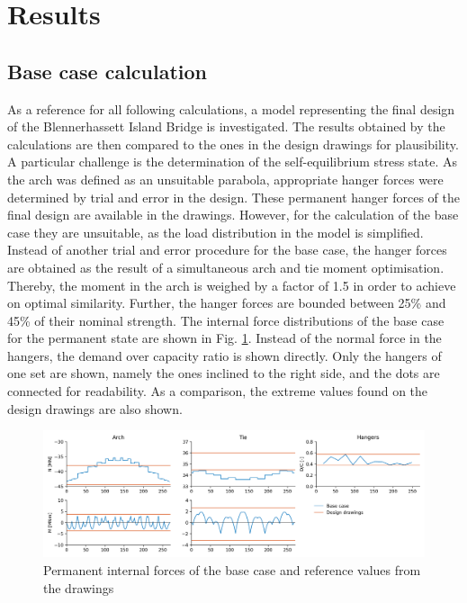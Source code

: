\section{Results}\label{sec:results}

\subsection{Base case calculation}
As a reference for all following calculations, a model representing the final design of the Blennerhassett Island Bridge is investigated. The results obtained by the calculations are then compared to the ones in the design drawings for plausibility. A particular challenge is the determination of the self-equilibrium stress state. As the arch was defined as an unsuitable parabola, appropriate hanger forces were determined by trial and error in the design. These permanent hanger forces of the final design are available in the drawings. However, for the calculation of the base case they are unsuitable, as the load distribution in the model is simplified. Instead of another trial and error procedure for the base case, the hanger forces are obtained as the result of a simultaneous arch and tie moment optimisation. Thereby, the moment in the arch is weighed by a factor of 1.5 in order to achieve on optimal similarity. Further, the hanger forces are bounded between 25\% and 45\% of their nominal strength. The internal force distributions of the base case for the permanent state are shown in Fig. \ref{fig:base_case_permanent}. Instead of the normal force in the hangers, the demand over capacity ratio is shown directly. Only the hangers of one set are shown, namely the ones inclined to the right side, and the dots are connected for readability. As a comparison, the extreme values found on the design drawings are also shown.

\begin{figure}[H]
    \centering
    \includegraphics[width=\textwidth]{calculations/Base case/Permanent state.png}
    \caption{Permanent internal forces of the base case and reference values from the drawings}
    \label{fig:base_case_permanent}
\end{figure}

